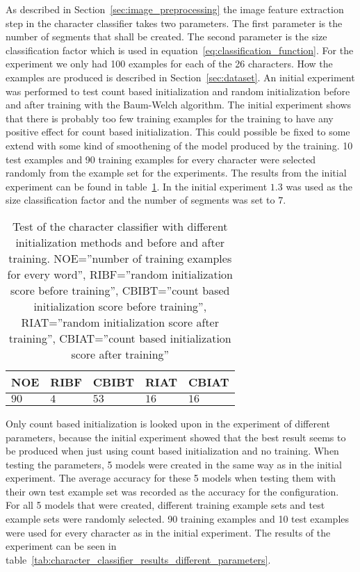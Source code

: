 As described in Section~\ref{sec:image_preprocessing} the image feature extraction step in the character classifier takes two parameters.
The first parameter is the number of segments that shall be created. 
The second parameter is the size classification factor which is used in equation~\ref{eq:classification_function}. 
For the experiment we only had 100 examples for each of the 26 characters. 
How the examples are produced is described in Section~\ref{sec:dataset}. 
An initial experiment was performed to test count based initialization and random initialization before and after training with the Baum-Welch algorithm.
The initial experiment shows that there is probably too few training examples for the training to have any positive effect for count based initialization. 
This could possible be fixed to some extend with some kind of smoothening of the model produced by the training. 
10 test examples and 90 training examples for every character were selected randomly from the example set for the experiments. 
The results from the initial experiment can be found in table~\ref{tab:character_classifier_initial_experiment}. 
In the initial experiment $1.3$ was used as the size classification factor and the number of segments was set to $7$.


\begin{table}[htb]
  \begin{center}
  \begin{tabular}{ l l l l l }
    NOE    & RIBF   & CBIBT  & RIAT    & CBIAT \\ \hline
    $90$  & $4$ & $53$ & $16$  & $16$  \\   
  \end{tabular}
\end{center}
\caption{Test of the character classifier with different initialization methods and before and after training.
	 NOE=''number of training examples for every word'',
         RIBF=''random initialization score before training'',
         CBIBT=''count based initialization score before training'',
         RIAT=''random initialization score after training'',
         CBIAT=''count based initialization score after training''} 
\label{tab:character_classifier_initial_experiment} 
\end{table}

Only count based initialization is looked upon in the experiment of different parameters, because the initial experiment showed that the best result seems to be produced when just using count based initialization and no training.
When testing the parameters, 5 models were created in the same way as in the initial experiment. 
The average accuracy for these 5 models when testing them with their own test example set was recorded as the accuracy for the configuration. 
For all 5 models that were created, different training example sets and test example sets were randomly selected. 
90 training examples and 10 test examples were used for every character as in the initial experiment. 
The results of the experiment can be seen in table~\ref{tab:character_classifier_results_different_parameters}.


